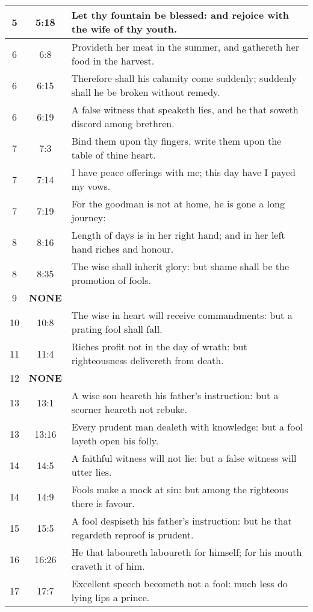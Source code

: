 \begin{center}
\begin{longtable}{c|c|p{3.5in}}
5 & 5:18  & Let thy fountain be blessed: and rejoice with the wife of thy youth.   \\  \hline
6 & 6:8  & Provideth her meat in the summer, and gathereth her food in the harvest.  \\ 
6 & 6:15  &  Therefore shall his calamity come suddenly; suddenly shall he be broken without remedy.\\ 
6 & 6:19  & A false witness that speaketh lies, and he that soweth discord among brethren.  \\  \hline
7 & 7:3  & Bind them upon thy fingers, write them upon the table of thine heart.  \\ 
7 & 7:14  &   I have peace offerings with me; this day have I payed my vows. \\ 
7 & 7:19  & For the goodman is not at home, he is gone a long journey: \\ \hline
8 & 8:16  &  Length of days is in her right hand; and in her left hand riches and honour. \\ 
8 & 8:35  & The wise shall inherit glory: but shame shall be the promotion of fools. \\  \hline
9 & \textbf{\textcolor[rgb]{0.00,1.00,0.00}{NONE}}  &\\ \hline
10 & 10:8  & The wise in heart will receive commandments: but a prating fool shall fall. \\ \hline
11 & 11:4 & Riches profit not in the day of wrath: but righteousness delivereth from death.   \\ \hline
12 & \textbf{\textcolor[rgb]{0.00,1.00,0.00}{NONE}}  &\\ \hline
13 & 13:1 &   A   wise son heareth his father’s instruction: but a scorner heareth not rebuke. \\ 
13 & 13:16 &  Every prudent man dealeth with knowledge: but a fool layeth open his folly. \\ \hline
14 & 14:5 &  A faithful witness will not lie: but a false witness will utter lies. \\ 
14 & 14:9 & Fools make a mock at sin: but among the righteous there is favour.   \\  \hline
15 & 15:5 & A fool despiseth his father’s instruction: but he that regardeth reproof is prudent.  \\  \hline
16 & 16:26 & He that laboureth laboureth for himself; for his mouth craveth it of him.  \\  \hline
17 & 17:7 &  Excellent speech becometh not a fool: much less do lying lips a prince. \\  

\end{longtable}
\end{center}

